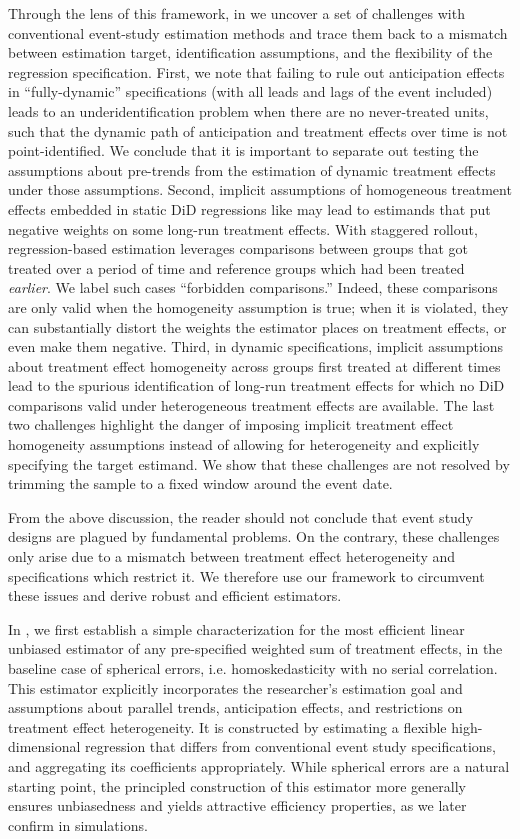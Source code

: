 \documentclass[english,11pt]{article}
\theoremstyle{plain}
\theoremstyle{plain}
\theoremstyle{plain}
\theoremstyle{plain}
\let\ref\Cref
\begin{document}
Through the lens of this framework, in \ref{sec:Conventional-Practice}
we uncover a set of challenges with conventional event-study estimation
methods and trace them back to a mismatch between estimation target,
identification assumptions, and the flexibility of the regression
specification. First, we note that failing to rule out anticipation
effects in ``fully-dynamic'' specifications (with all leads and
lags of the event included) leads to an underidentification problem
when there are no never-treated units, such that the dynamic path
of anticipation and treatment effects over time is not point-identified.
We conclude that it is important to separate out testing the assumptions
about pre-trends from the estimation of dynamic treatment effects
under those assumptions. Second, implicit assumptions of homogeneous
treatment effects embedded in static DiD regressions like \ref{eq:baselineTEmodel}
may lead to estimands that put negative weights on some long-run treatment
effects. With staggered rollout, regression-based estimation leverages
comparisons between groups that got treated over a period of time
and reference groups which had been treated \emph{earlier}. We label
such cases ``forbidden comparisons.'' Indeed, these comparisons
are only valid when the homogeneity assumption is true; when it is
violated, they can substantially distort the weights the estimator
places on treatment effects, or even make them negative. Third, in
dynamic specifications, implicit assumptions about treatment effect
homogeneity across groups first treated at different times lead to
the spurious identification of long-run treatment effects for which
no DiD comparisons valid under heterogeneous treatment effects are
available. The last two challenges highlight the danger of imposing
implicit treatment effect homogeneity assumptions instead of allowing
for heterogeneity and explicitly specifying the target estimand. We
show that these challenges are not resolved by trimming the sample
to a fixed window around the event date.

From the above discussion, the reader should not conclude that event
study designs are plagued by fundamental problems. On the contrary,
these challenges only arise due to a mismatch between treatment effect
heterogeneity and specifications which restrict it. We therefore use
our framework to circumvent these issues and derive robust and efficient
estimators.

In \ref{sec:Imputation-Solution}, we first establish a simple characterization
for the most efficient linear unbiased estimator of any pre-specified
weighted sum of treatment effects, in the baseline case of spherical
errors, i.e. homoskedasticity with no serial correlation. This estimator
explicitly incorporates the researcher's estimation goal and assumptions
about parallel trends, anticipation effects, and restrictions on treatment
effect heterogeneity. It is constructed by estimating a flexible high-dimensional
regression that differs from conventional event study specifications,
and aggregating its coefficients appropriately. While spherical errors
are a natural starting point, the principled construction of this
estimator more generally ensures unbiasedness and yields attractive
efficiency properties, as we later confirm in simulations.
\end{document}
